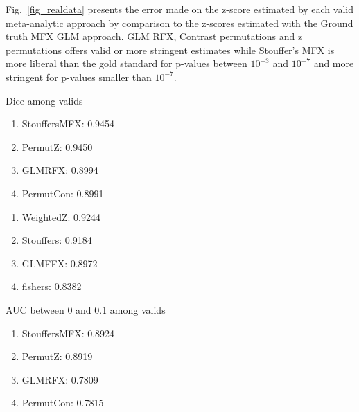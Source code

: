 \documentclass{llncs}
\begin{document}
Fig.~\ref{fig_realdata} presents the error made on the z-score estimated by each valid meta-analytic approach by comparison to the z-scores estimated with the Ground truth MFX GLM approach. GLM RFX, Contrast permutations and z permutations offers valid or more stringent estimates while Stouffer's MFX is more liberal than the gold standard for p-values between $10^{-3}$ and $10^{-7}$ and more stringent for p-values smaller than $10^{-7}$.


Dice among valids
\begin{enumerate}
\item StouffersMFX: 0.9454
\item PermutZ: 0.9450
\item GLMRFX: 0.8994
\item PermutCon: 0.8991
\end{enumerate}

\begin{enumerate}
\item WeightedZ: 0.9244
\item Stouffers: 0.9184
\item GLMFFX: 0.8972
\item fishers: 0.8382
\end{enumerate}

AUC between 0 and 0.1
among valids
\begin{enumerate}
\item StouffersMFX: 0.8924
\item PermutZ: 0.8919
\item GLMRFX: 0.7809
\item PermutCon: 0.7815
\end{enumerate}
\end{document}
